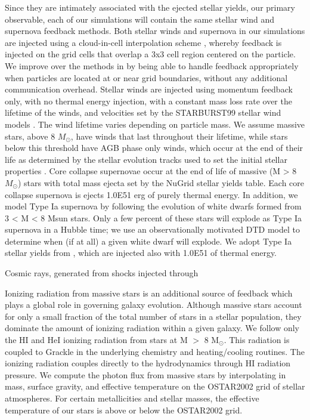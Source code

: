 \documentclass[11pt]{article}
\begin{document}
Since they are intimately associated with the ejected stellar yields, our primary observable, each of our simulations will contain the same stellar wind and supernova feedback methods. Both stellar winds and supernova in our simulations are injected using a cloud-in-cell interpolation scheme \citep{Simpson2016}, whereby feedback is injected on the grid cells that overlap a 3x3 cell region centered on the particle. We improve over the methods in \cite{Simpson2016} by being able to handle feedback appropriately when particles are located at or near grid boundaries, without any additional communication overhead. Stellar winds are injected using momentum feedback only, with no thermal energy injection, with a constant mass loss rate over the lifetime of the winds, and velocities set by the STARBURST99 stellar wind models \citep{Leitherer1992}. The wind lifetime varies depending on particle mass. We assume massive stars, above 8 $M_{\odot}$, have winds that last throughout their lifetime, while stars below this threshold have AGB phase only winds, which occur at the end of their life as determined by the stellar evolution tracks used to set the initial stellar properties \citep{Bressan2012}. Core collapse supernovae occur at the end of life of massive (M > 8 $M_{\odot}$) stars with total mass ejecta set by the NuGrid stellar yields table. Each core collapse supernova is ejects 1.0E51 erg of purely thermal energy. In addition, we model Type Ia supernova by following the evolution of white dwarfs formed from 3 < M < 8 Msun stars. Only a few percent of these stars will explode as Type Ia supernova in a Hubble time; we use an observationally motivated DTD model to determine when (if at all) a given white dwarf will explode. We adopt Type Ia stellar yields from \cite{Thielemann1986}, which are injected also with 1.0E51 of thermal energy.

Cosmic rays, generated from shocks injected through 

Ionizing radiation from massive stars is an additional source of feedback which plays a global role in governing galaxy evolution. Although massive stars account for only a small fraction of the total number of stars in a stellar population, they dominate the amount of ionizing radiation within a given galaxy. We follow only the HI and HeI ionizing radiation from stars at M $>$ 8 M$_{\odot}$. This radiation is coupled to Grackle in the underlying chemistry and heating/cooling routines. The ionizing radiation couples directly to the hydrodynamics through HI radiation pressure. We compute the photon flux from massive stars by interpolating in mass, surface gravity, and effective temperature on the OSTAR2002 \citep{Lanz2003} grid of stellar atmospheres. For certain metallicities and stellar masses, the effective temperature of our stars is above or below the OSTAR2002 grid. 
\end{document}
